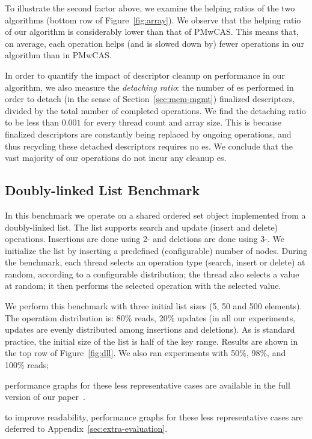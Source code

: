 To illustrate the second factor above, we examine the helping ratios of the two algorithms (bottom row of Figure~\ref{fig:array}). We observe that the helping ratio of our algorithm is considerably lower than that of PMwCAS. This means that, on average, each operation helps (and is slowed down by) fewer \mcas{} operations in our algorithm than in PMwCAS. 

In order to quantify the impact of descriptor cleanup on performance in our algorithm, we also measure the \textit{detaching ratio}: the number of \cas{}es performed in order to detach (in the sense of Section~\ref{sec:mem-mgmt})  finalized \mcas{} descriptors, divided by the total number of completed \mcas{} operations. We find the detaching ratio to be less than $0.001$ for every thread count and array size. This is because finalized \mcas{} descriptors are constantly being replaced by ongoing \mcas{} operations, and thus recycling these detached descriptors requires no \cas{}es. We conclude that the vast majority of our \mcas{} operations do not incur any cleanup \cas{}es.


\subsection{Doubly-linked List Benchmark}

In this benchmark we operate on a shared ordered set object implemented from a doubly-linked list. The list supports search and update (insert and delete) operations. Insertions are done using 2-\cas{} and deletions are done using 3-\cas{}. We initialize the list by inserting a predefined (configurable) number of nodes. During the benchmark, each thread selects an operation type (search, insert or delete) at random, according to a configurable distribution; the thread also selects a value at random; it then performs the selected operation with the selected value.

We perform this benchmark with three initial list sizes (5, 50 and 500 elements). The operation distribution is: 80\% reads, 20\% updates (in all our experiments, updates are evenly distributed among insertions and deletions). As is standard practice, the initial size of the list is half of the key range. Results are shown in the top row of Figure~\ref{fig:dll}. We also ran experiments with 50\%, 98\%, and 100\% reads;
\begin{camera}
performance graphs for these less representative cases are available in the full version of our paper~\cite{longversion}. 
\end{camera}\begin{arxiv}%
to improve readability, performance graphs for these less representative cases are deferred to Appendix~\ref{sec:extra-evaluation}.
\end{arxiv}

